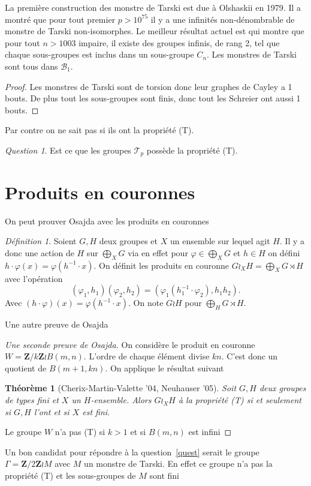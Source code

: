 \documentclass[a4paper]{article}
\newtheorem{thm}[lem]{Théorème}
\theoremstyle{remark}%
\newtheorem{defn}[lem]{Définition}
\newtheorem{quest}[lem]{Question}
\renewcommand*{\phi}{\varphi}
\newcommand*{\field}[1]{\mathbf{#1}}
\newcommand*{\Z}{\field{Z}}
\newcommand*{\B}{\mathcal{B}_1}
\newcommand*{\T}{\mathcal{T}}
\begin{document}
%
La première construction des monstre de Tarski est due à Olshaskii en 1979. Il a montré que pour tout premier $p>10^{75}$ il y a une infinités non-dénombrable de monstre de Tarski non-isomorphes. Le meilleur résultat actuel est \cite{Adyan1991} qui montre que pour tout $n>1003$ impaire, il existe des groupes infinis, de rang 2, tel que chaque sous-groupes est inclus dans un sous-groupe $C_n$.
Les monstres de Tarski sont tous dans $\B$. 
%
\begin{proof}
Les monstres de Tarski sont de torsion donc leur graphes de Cayley a 1 bouts. De plus tout les sous-groupes sont finis, donc tout les Schreier ont aussi 1 bouts.
\end{proof}
%
Par contre on ne sait pas si ils ont la propriété (T). 
\begin{quest}
Est ce que les groupes $\T_p$ possède la propriété (T). 
\end{quest}
%
%
\section{Produits en couronnes}
On peut prouver Osajda avec les produits en couronnes%
\begin{defn}
Soient $G,H$ deux groupes et $X$ un ensemble sur lequel agit $H$. Il y a donc une action de $H$ sur $\bigoplus_X G$ via en effet pour $\phi \in \bigoplus_X G$ et $h \in H$ on défini $h \cdot \phi (x) = \phi (h^{-1} \cdot x)$. On définit les produits en couronne $G \wr_X H = \bigoplus_X G \rtimes H$ avec l'opération 
\begin{equation*}
(\phi_1,h_1)(\phi_2,h_2) = (\phi_1 (h_1^{-1} \cdot \phi_2), h_1h_2).
\end{equation*}
Avec $(h\cdot \phi)(x)=\phi(h^{-1}\cdot x)$. On note $G \wr H$ pour $\bigoplus_H G \rtimes H$.
\end{defn}
%
Une autre preuve de Osajda 
\begin{proof}[Une seconde preuve de Osajda]
On considère le produit en couronne $W=\Z/k\Z \wr B(m,n)$. L'ordre de chaque élément divise $kn$. C'est donc un quotient de $B(m+1,kn)$. On applique le résultat suivant 
%
\begin{thm}[Cherix-Martin-Valette '04, Neuhauser '05]
Soit $G,H$ deux groupes de types fini et $X$ un $H$-ensemble. Alors $G \wr_X H$ à la propriété (T) si et seulement si $G,H$ l'ont et si $X$ est fini.\end{thm}
Le groupe $W$ n'a pas (T) si $k >1$ et si $B(m,n)$ est infini
\end{proof}
Un bon candidat pour répondre à la question~\ref{quest} serait le groupe $\Gamma = \Z/2\Z \wr M$ avec $M$ un monstre de Tarski. En effet ce groupe n'a pas la propriété (T) et les sous-groupes de $M$ sont fini
\end{document}
